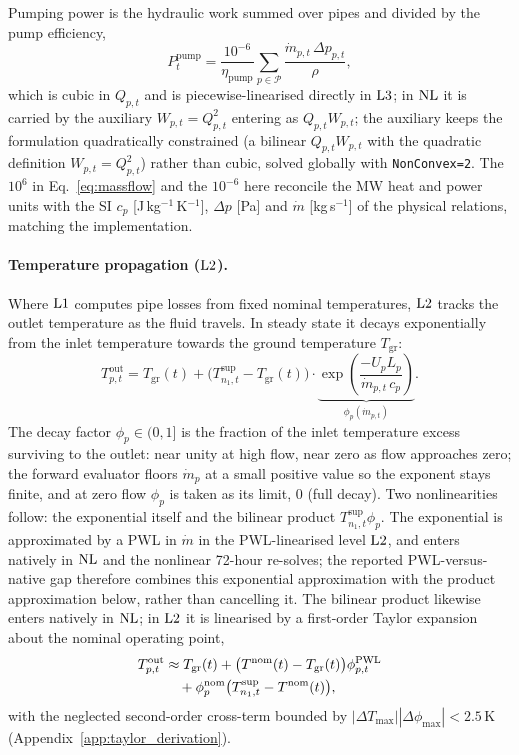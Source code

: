 Pumping power is the hydraulic work summed over pipes and divided by the pump efficiency,
\begin{equation}
  P_t^{\mathrm{pump}} = \frac{10^{-6}}{\eta_{\mathrm{pump}}}
    \sum_{p \in \mathcal{P}}
    \frac{\dot{m}_{p,t}\, \Delta p_{p,t}}{\rho},
  \label{eq:pump_power}
\end{equation}
which is cubic in $Q_{p,t}$ and is piecewise-linearised directly in $\mathrm{L3}$; in $\mathrm{NL}$
it is carried by the auxiliary $W_{p,t} = Q_{p,t}^2$ entering as $Q_{p,t} W_{p,t}$; the
auxiliary keeps the formulation quadratically constrained (a bilinear $Q_{p,t}W_{p,t}$ with the
quadratic definition $W_{p,t}=Q_{p,t}^2$) rather than cubic, solved globally with
\texttt{NonConvex=2}. The $10^{6}$ in
Eq.~\eqref{eq:massflow} and the $10^{-6}$ here reconcile the MW heat and power units with the
SI $c_p$ [J\,kg$^{-1}$\,K$^{-1}$], $\Delta p$ [Pa] and $\dot m$ [kg\,s$^{-1}$] of the physical
relations, matching the implementation.

\paragraph{Temperature propagation ($\mathrm{L2}$).}
Where $\mathrm{L1}$ computes pipe losses from fixed nominal temperatures, $\mathrm{L2}$ tracks the
outlet temperature as the fluid travels. In steady state it decays exponentially from the
inlet temperature towards the ground temperature $T_{\mathrm{gr}}$:
\begin{equation}
  T_{p,t}^{\mathrm{out}} = T_{\mathrm{gr}}(t)
    + \bigl(T_{n_1,t}^{\mathrm{sup}} - T_{\mathrm{gr}}(t)\bigr)
    \cdot \underbrace{\exp\!\left(
      \frac{-U_p L_p}{\dot{m}_{p,t}\, c_p}
    \right)}_{\displaystyle\phi_p(\dot{m}_{p,t})}.
  \label{eq:temp_prop}
\end{equation}
The decay factor $\phi_p \in (0,1]$ is the fraction of the inlet temperature excess
surviving to the outlet: near unity at high flow, near zero as flow approaches zero; the
forward evaluator floors $\dot{m}_p$ at a small positive value so the exponent stays finite,
and at zero flow $\phi_p$ is taken as its limit, $0$ (full decay). Two
nonlinearities follow: the exponential itself and the bilinear product
$T_{n_1,t}^{\mathrm{sup}} \phi_p$. The exponential is approximated by a PWL in $\dot{m}$ in the
PWL-linearised level $\mathrm{L2}$, and enters natively in $\mathrm{NL}$ and the nonlinear 72-hour re-solves; the
reported PWL-versus-native gap therefore combines this exponential approximation with the
product approximation below, rather than cancelling it. The bilinear product likewise enters
natively in $\mathrm{NL}$; in $\mathrm{L2}$ it is linearised by a first-order Taylor expansion about the
nominal operating point,
\begin{align}
  T_{p,t}^{\mathrm{out}} &\approx T_{\mathrm{gr}}(t)
    + \bigl(T^{\mathrm{nom}}(t) - T_{\mathrm{gr}}(t)\bigr)
      \phi_{p,t}^{\mathrm{PWL}} \notag \\
    &\quad + \phi_p^{\mathrm{nom}}
      \bigl(T_{n_1,t}^{\mathrm{sup}} - T^{\mathrm{nom}}(t)\bigr),
  \label{eq:temp_prop_lin}
\end{align}
with the neglected second-order cross-term bounded by
$|\Delta T_{\max}||\Delta\phi_{\max}| < 2.5$\,K (Appendix~\ref{app:taylor_derivation}).

